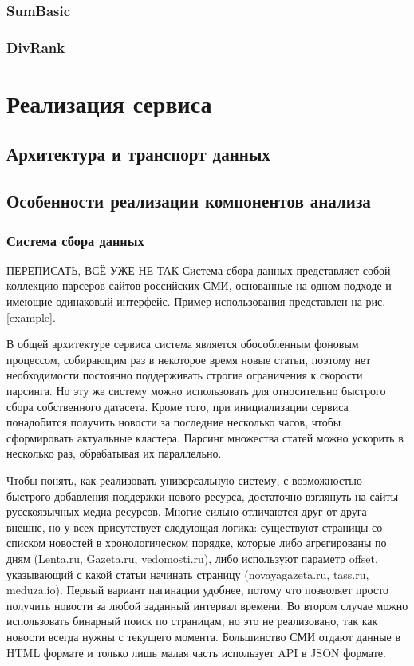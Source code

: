\documentclass[a4paper, 14pt]{extarticle}
\begin{document}
\subsubsection{SumBasic}
\subsubsection{DivRank}


\section{Реализация сервиса}
\subsection{Архитектура и транспорт данных}
\subsection{Особенности реализации компонентов анализа}
\subsubsection{Система сбора данных}

{\LARGE ПЕРЕПИСАТЬ, ВСЁ УЖЕ НЕ ТАК}
Система сбора данных представляет собой коллекцию парсеров сайтов российских СМИ, основанные на одном подходе и имеющие одинаковый интерфейс. Пример использования представлен на рис. \ref{example}.

В общей архитектуре сервиса система является обособленным фоновым процессом, собирающим раз в некоторое время новые статьи, поэтому нет необходимости постоянно поддерживать строгие ограничения к скорости парсинга. Но эту же систему можно использовать для относительно быстрого сбора собственного датасета. Кроме того, при инициализации сервиса понадобится получить новости за последние несколько часов, чтобы сформировать актуальные кластера. Парсинг множества статей можно ускорить в несколько раз, обрабатывая их параллельно.

Чтобы понять, как реализовать универсальную систему, с возможностью быстрого добавления поддержки нового ресурса, достаточно взглянуть на сайты русскоязычных медиа-ресурсов. Многие сильно отличаются друг от друга внешне, но у всех присутствует следующая логика: существуют страницы со списком новостей в хронологическом порядке, которые либо агрегированы по дням (Lenta.ru, Gazeta.ru, vedomosti.ru), либо используют параметр offset, указывающий с какой статьи начинать страницу (novayagazeta.ru, tass.ru, meduza.io). Первый вариант пагинации удобнее, потому что позволяет просто получить новости за любой заданный интервал времени. Во втором случае можно использовать бинарный поиск по страницам, но это не реализовано, так как новости всегда нужны с текущего момента.
Большинство СМИ отдают данные в HTML формате и только лишь малая часть использует API в JSON формате.
\end{document}
